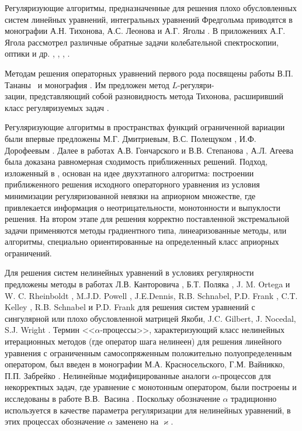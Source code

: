 {Регуляризующие алгоритмы, предназначенные для решения плохо обусловленных систем линейных уравнений, интегральных уравнений Фредгольма приводятся в монографии А.Н. Тихонова, А.С. Леонова и А.Г. Яголы \cite{TihLeoYag2017}. В приложениях А.Г. Ягола рассмотрел различные обратные задачи колебательной спектроскопии, оптики и др. \cite{KliKosLiYag2016}, \cite{IsaLukTihYag2017}, \cite{KocKurPenYag2017}, \cite{LukYag2016}.

Методам решения операторных уравнений первого рода посвящены работы В.П. Тананы~\cite{Tan1977, Tan1997} и монография \cite{Tan1981}. Им предложен метод $L$-регуляри-\\зации, представляющий собой разновидность метода Тихонова, расширивший класс регуляризуемых задач \cite{Tan2003_1,Tan2003_2}.

Регуляризующие алгоритмы в пространствах функций ограниченной вариации были впервые предложены М.Г. Дмитриевым, В.С. Полещуком \cite{DmiPol1972}, И.Ф. Дорофеевым \cite{Dor1979}. Далее в работах А.В. Гончарского и В.В. Степанова \cite{GonSte1979}, А.Л. Агеева \cite{Ag1980} была доказана равномерная сходимость приближенных решений. Подход, изложенный в \cite{TikhGonSteYag1990}, основан на идее двухэтапного алгоритма: построении приближенного решения  исходного операторного уравнения из условия минимизации регуляризованной невязки на априорном множестве, где привлекается информация о неотрицательности, монотонности и выпуклости решения. 
На втором этапе для решения корректно поставленной экстремальной задачи применяются методы градиентного типа, линеаризованные методы, или алгоритмы, специально ориентированные на определенный класс априорных ограничений.

Для решения систем нелинейных уравнений в условиях регулярности предложены методы в работах Л.В. Канторовича \cite{Kan1947}, Б.Т. Поляка \cite{Pol1969}, J. M. Ortega и W. C. Rheinboldt \cite{OrtRhe1970}, M.J.D. Powell \cite{Pow1970}, J.E.Dennis, R.B. Schnabel, P.D. Frank \cite{DenSchn1996}, C.T. Kelley \cite{Kel1995}, R.B. Schnabel и P.D. Frank \cite{SchnFra1983} для решения систем уравнений с сингулярной или плохо обусловленной матрицей Якоби, J.C. Gilbert, J. Nocedal, S.J. Wright \cite{GilNoc1991, NocWri2006}. Термин <<$\alpha$-процессы>>, характеризующий класс нелинейных итерационных методов (где оператор шага нелинеен) для решения линейного уравнения с ограниченным самосопряженным положительно полуопределенным оператором, был введен в монографии М.А. Красносельского, Г.М. Вайникко, П.П. Забрейко \cite{KraVayZab1969}. Нелинейные модифицированные аналоги $\alpha$-процессов для некорректных задач, где уравнение с монотонным оператором, были построены и исследованы в работе В.В.~Васина \cite{Vasin2016}. Поскольку обозначение $\alpha$ традиционно используется в качестве параметра регуляризации для нелинейных уравнений, в этих процессах обозначение $\alpha$ заменено на $\varkappa$.

}
